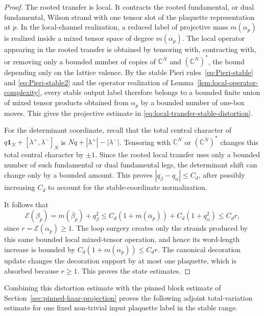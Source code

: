 \documentclass[11pt,a4paper,reqno]{amsart}
\theoremstyle{definition}
\theoremstyle{remark}
\begin{document}
\begin{proof}
The rooted transfer is local.  It contracts the rooted fundamental, or dual fundamental, Wilson strand with one tensor slot of the plaquette representation at $p$.  In the local-channel realization, a reduced label of projective mass $m(\alpha_p)$ is realized inside a mixed tensor space of degree $m(\alpha_p)$.  The local operator appearing in the rooted transfer is obtained by tensoring with, contracting with, or removing only a bounded number of copies of $\mathbb C^N$ and $(\mathbb C^N)^*$, the bound depending only on the lattice valence.  By the stable Pieri rules~\eqref{eq:Pieri-stable} and \eqref{eq:Pieri-stable2} and the operator realization of Lemma~\ref{lem:local-operator-complexity}, every stable output label therefore belongs to a bounded finite union of mixed tensor products obtained from $\alpha_p$ by a bounded number of one-box moves.  This gives the projective estimate in \eqref{eq:local-transfer-stable-distortion}.

For the determinant coordinate, recall that the total central character of
$q\mathbf 1_N+[\lambda^+,\lambda^-]_N$ is $Nq+|\lambda^+|-|\lambda^-|$.  Tensoring with $\mathbb C^N$ or $(\mathbb C^N)^*$ changes this total central character by $\pm1$.  Since the rooted local transfer uses only a bounded number of such fundamental or dual fundamental legs, the determinant shift can change only by a bounded amount.  This proves $|q_\beta-q_\alpha|\le C_d$, after possibly increasing $C_d$ to account for the stable-coordinate normalization.

It follows that
\[
\mathcal E(\beta_p)
=m(\overline\beta_p)+q_\beta^2
\le C_d(1+m(\overline\alpha_p))+C_d(1+q_\alpha^2)
\le C_d r,
\]
since $r=\mathcal E(\alpha_p)\ge1$.  The loop surgery creates only the strands produced by this same bounded local mixed-tensor operation, and hence its word-length increase is bounded by $C_d(1+m(\alpha_p))\le C_d r$.  The canonical decoration update changes the decoration support by at most one plaquette, which is absorbed because $r\ge1$.  This proves the state estimates.
\end{proof}

Combining this distortion estimate with the pinned block estimate of Section~\ref{sec:pinned-haar-projection} proves the following adjoint total-variation estimate for one fixed non-trivial input plaquette label in the stable range.
\end{document}
